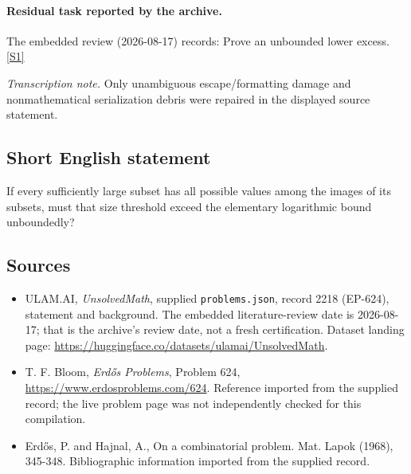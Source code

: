 \documentclass[11pt,a4paper]{article}
\newcommand{\sref}[2]{\hyperlink{source:#1:#2}{[S#2]}}
\begin{document}
\paragraph{Residual task reported by the archive.}

The embedded review (2026-08-17) records: Prove an unbounded lower excess. \sref{2218}{1}

{\small\emph{Transcription note.} Only unambiguous escape/formatting damage and nonmathematical serialization debris were repaired in the displayed source statement.}

\subsection{Short English statement}

If every sufficiently large subset has all possible values among the images of its subsets, must that size threshold exceed the elementary logarithmic bound unboundedly?

\subsection{Sources}

{\small

\begin{itemize}

\item[\hypertarget{source:2218:1}{S1}] ULAM.AI, \emph{UnsolvedMath}, supplied \texttt{problems.json}, record 2218 (EP-624), statement and background. The embedded literature-review date is 2026-08-17; that is the archive’s review date, not a fresh certification. Dataset landing page: \url{https://huggingface.co/datasets/ulamai/UnsolvedMath}.

\item[\hypertarget{source:2218:2}{S2}] T. F. Bloom, \emph{Erdős Problems}, Problem 624, \url{https://www.erdosproblems.com/624}. Reference imported from the supplied record; the live problem page was not independently checked for this compilation.

\item[\hypertarget{source:2218:3}{S3}] Erd\H{o}s, P. and Hajnal, A., On a combinatorial problem. Mat. Lapok (1968), 345-348. Bibliographic information imported from the supplied record.

\end{itemize}

}

\label{end:2218}
\end{document}
